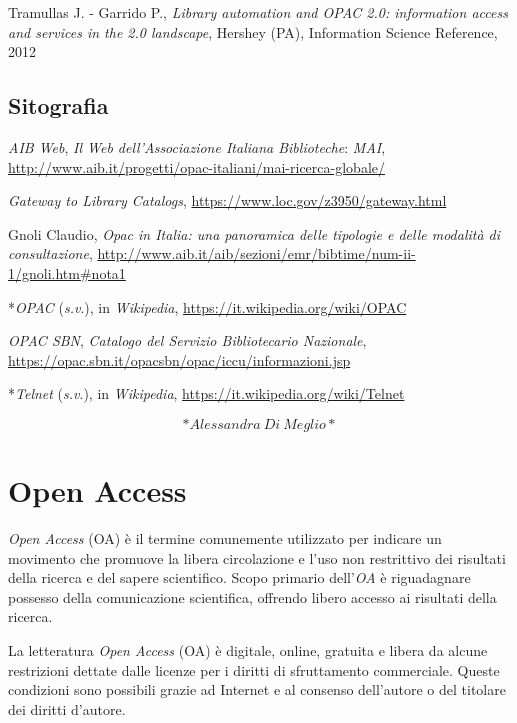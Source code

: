 \documentclass[
  b5paper,
  twoside,
  12pt,
  chapterprefix=false,
  bibliography=totocnumbered,
  parskip=false]{scrbook}
\begin{document}
Tramullas J. - Garrido P., \emph{Library automation and OPAC 2.0: information
access and services in the 2.0 landscape}, Hershey (PA), Information
Science Reference, 2012

\hypertarget{sitografia-24}{%
\section*{Sitografia}\label{sitografia-24}}

\emph{AIB Web}, \emph{Il Web dell'Associazione Italiana Biblioteche}: \emph{MAI},
\url{http://www.aib.it/progetti/opac-italiani/mai-ricerca-globale/}

\emph{Gateway to Library Catalogs},
\url{https://www.loc.gov/z3950/gateway.html}

Gnoli Claudio, \emph{Opac in Italia: una panoramica delle tipologie e delle
modalità di consultazione},
\href{http://www.aib.it/aib/sezioni/emr/bibtime/num-ii-1/gnoli.htm\#nota1}{{http://www.aib.it/aib/sezioni/emr/bibtime/num-ii-1/gnoli.htm\#nota1}}

*\emph{OPAC} (\emph{s.v}.), in \emph{Wikipedia},
\url{https://it.wikipedia.org/wiki/OPAC}

\emph{OPAC SBN}, \emph{Catalogo del Servizio Bibliotecario Nazionale},
\url{https://opac.sbn.it/opacsbn/opac/iccu/informazioni.jsp}

*\emph{Telnet} (\emph{s.v}.), in \emph{Wikipedia},
\url{https://it.wikipedia.org/wiki/Telnet}

\[*Alessandra~Di~Meglio*\]

\hypertarget{open-access}{%
\chapter{Open Access}\label{open-access}}

\emph{Open Access} (OA) è il termine comunemente utilizzato per indicare un
movimento che promuove la libera circolazione e l'uso non restrittivo
dei risultati della ricerca e del sapere scientifico. Scopo primario
dell'\emph{OA} è riguadagnare possesso della comunicazione scientifica,
offrendo libero accesso ai risultati della ricerca.

La letteratura \emph{Open Access} (OA) è digitale, online, gratuita e libera
da alcune restrizioni dettate dalle licenze per i diritti di
sfruttamento commerciale. Queste condizioni sono possibili grazie ad
Internet e al consenso dell'autore o del titolare dei diritti
d'autore.
\end{document}
